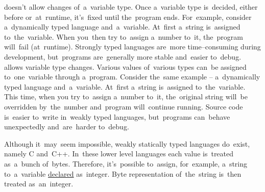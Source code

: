 \begin{itemize}
     doesn't allow changes of~a~variable type.
            Once a~variable type is~decided, either before or~at~runtime, it's~fixed until the~program ends.
            For~example, consider a~dynamically typed language and~a~variable.
            At~first a~string is~assigned to~the~variable.
            When you~then try to~assign a~number to~it, the~program will~fail (at~runtime).
            Strongly typed languages are~more time--consuming during development, but~programs are~generally more stable and~easier to~debug.
     allows variable type changes.
            Various values of~various types can~be assigned to~one~variable through a~program.
            Consider the~same example -- a~dynamically typed language and~a~variable.
            At~first a~string is~assigned to~the~variable.
            This time, when you try to~assign a~number to~it, the~original string will~be overridden by~the~number and~program will~continue running.
            Source code is~easier to~write in~weakly typed languages, but~programs can~behave unexpectedly and~are~harder to~debug.
\end{itemize}

\warning Although it~may~seem impossible, weakly statically typed languages do~exist, namely C and~C++.
In~these lower level languages each value is~treated as~a~bunch of~bytes.
Therefore, it's~possible to~assign, for~example, a~string to~a~variable \hyperref[declarationdefinition]{declared} as~integer.
Byte representation of~the~string is~then treated as~an~integer.
\newpage

